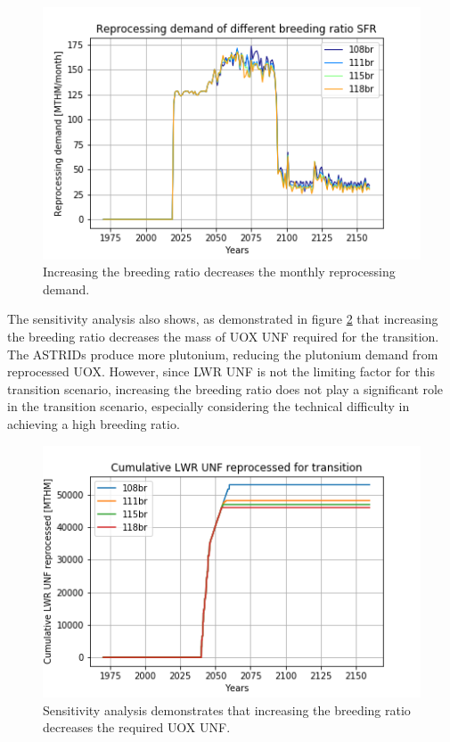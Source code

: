 \begin{figure}[htbp!]
    \begin{center}
        \includegraphics[scale=0.6]{./images/sensitivity/br_tot_rep.png}
    \end{center}
    \caption{Increasing the breeding ratio decreases the monthly reprocessing 
    demand.}
    \label{fig:br_rep}
\end{figure}

The sensitivity analysis also shows, as demonstrated in figure \ref{fig:br_uox} that 
increasing the breeding ratio decreases the mass of \gls{UOX} \gls{UNF} 
required for the transition. The \glspl{ASTRID} produce 
more plutonium, reducing the plutonium demand from 
reprocessed \gls{UOX}. However, since \gls{LWR} \gls{UNF} is not
the limiting factor for this transition scenario,
increasing the breeding ratio does not play a significant
role in the transition scenario, especially considering the technical difficulty
in achieving a high breeding ratio.

\begin{figure}[htbp!]
    \begin{center}
        \includegraphics[scale=0.6]{./images/sensitivity/br_uox_unf_cum.png}
    \end{center}
    \caption{Sensitivity analysis demonstrates that increasing the breeding 
    ratio decreases the required \gls{UOX} \gls{UNF}. }
    \label{fig:br_uox}
\end{figure}

